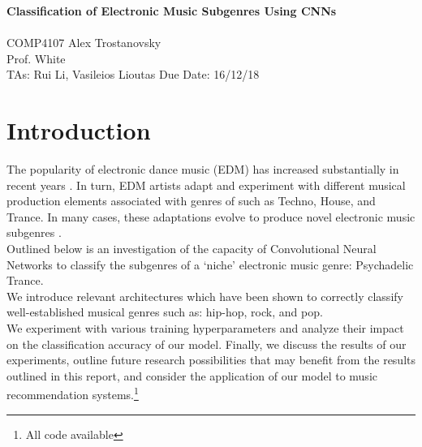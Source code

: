 \documentclass[12pt]{article}
\newcounter{ct}
\begin{document}
\noindent
\large\textbf{Classification of Electronic Music Subgenres Using CNNs}\\ 
 \\
\normalsize COMP4107 \hfill Alex Trostanovsky \\
Prof. White \hfill \\
TAs: Rui Li, Vasileios Lioutas \hfill Due Date: 16/12/18



\section*{Introduction}

The popularity of electronic dance music (EDM) has increased substantially in 
recent years 
\cite{c1}. In turn, EDM artists
adapt and experiment with 
different musical production elements associated with genres of
such as Techno, House, and Trance. In many cases, these
adaptations evolve to produce novel electronic music subgenres \cite{c2}\cite{c3}.\\
Outlined below is an investigation of the capacity of Convolutional Neural
Networks to classify the subgenres of a `niche' electronic
music genre: Psychadelic Trance. \\ We introduce relevant architectures 
which have been shown to correctly classify well-established musical 
genres such as: hip-hop, rock, and pop.\\
We experiment with various training hyperparameters and analyze their
impact on the classification accuracy of our model. Finally,
we discuss the results of our experiments, outline 
future research possibilities that may benefit from the results outlined 
in this report, and consider the application
of our model to music recommendation systems.\footnote{All code available
}
\end{document}
